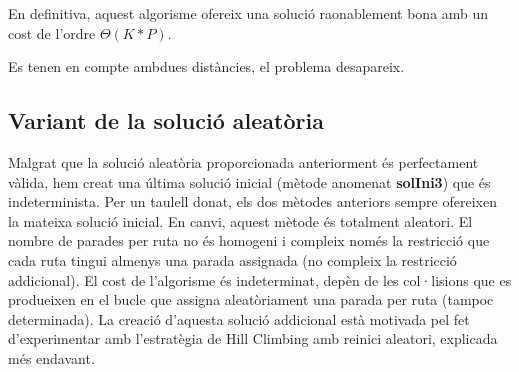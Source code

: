 En definitiva, aquest algorisme ofereix una solució raonablement bona amb un cost de l'ordre $\Theta(K * P)$.


 {Es tenen en compte ambdues distàncies, el problema desapareix.}

\subsection{Variant de la solució aleatòria}

Malgrat que la solució aleatòria proporcionada anteriorment és perfectament vàlida, hem creat una última solució inicial (mètode anomenat \textbf{solIni3}) que és indeterminista. Per un taulell donat, els dos mètodes anteriors sempre ofereixen la mateixa solució inicial. En canvi, aquest mètode és totalment aleatori. El nombre de parades per ruta no és homogeni i compleix només la restricció que cada ruta tingui almenys una parada assignada (no compleix la restricció addicional). El cost de l'algorisme és indeterminat, depèn de les col·lisions que es produeixen en el bucle que assigna aleatòriament una parada per ruta (tampoc determinada). La creació d'aquesta solució addicional està motivada pel fet d'experimentar amb l'estratègia de Hill Climbing amb reinici aleatori, explicada més endavant.

